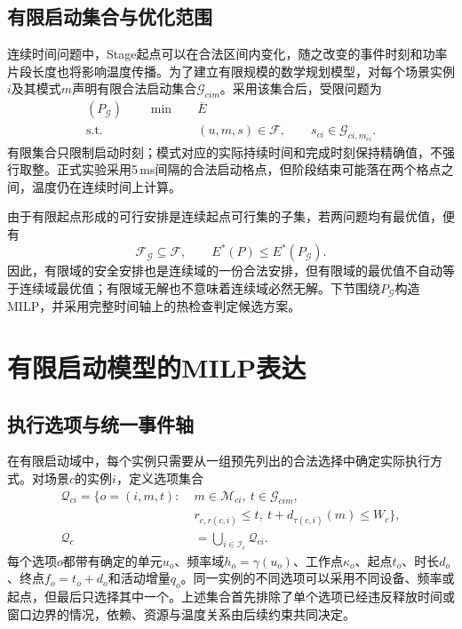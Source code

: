 \subsection{有限启动集合与优化范围}

连续时间问题中，Stage起点可以在合法区间内变化，随之改变的事件时刻和功率片段长度也将影响温度传播。为了建立有限规模的数学规划模型，对每个场景实例$i$及其模式$m$声明有限合法启动集合$\mathcal G_{cim}$。采用该集合后，受限问题为
\begin{equation}
 \begin{aligned}
 (P_{\mathcal G})\qquad
 \min\quad&\overline E\\
 \mathrm{s.t.}\quad&
   (u,m,s)\in\mathcal F,\qquad
   s_{ci}\in\mathcal G_{ci,m_{ci}}.
 \end{aligned}
 \label{eq:c3-finite-P}
\end{equation}
有限集合只限制启动时刻；模式对应的实际持续时间和完成时刻保持精确值，不强行取整。正式实验采用5\,ms间隔的合法启动格点，但阶段结束可能落在两个格点之间，温度仍在连续时间上计算。

由于有限起点形成的可行安排是连续起点可行集的子集，若两问题均有最优值，便有
\begin{equation}
 \mathcal F_{\mathcal G}\subseteq\mathcal F,\qquad
 E^*(P)\le E^*(P_{\mathcal G}).
 \label{eq:c3-restricted-bound}
\end{equation}
因此，有限域的安全安排也是连续域的一份合法安排，但有限域的最优值不自动等于连续域最优值；有限域无解也不意味着连续域必然无解。下节围绕$P_{\mathcal G}$构造MILP，并采用完整时间轴上的热检查判定候选方案。


\section{有限启动模型的MILP表达}

\subsection{执行选项与统一事件轴}

在有限启动域中，每个实例只需要从一组预先列出的合法选择中确定实际执行方式。对场景$c$的实例$i$，定义选项集合
\begin{equation}
 \begin{aligned}
 \mathcal Q_{ci}
 =\bigl\{o=(i,m,t):\;&m\in\mathcal M_{ci},\
 t\in\mathcal G_{cim},\\[-1mm]
 &r_{c,r(c,i)}\le t,\
 t+d_{\tau(c,i)}(m)\le W_c\bigr\},\\
 \mathcal Q_c&=\bigcup_{i\in\mathcal I_c}\mathcal Q_{ci}.
 \end{aligned}
 \label{eq:c3-options}
\end{equation}
每个选项$o$都带有确定的单元$u_o$、频率域$h_o=\gamma(u_o)$、工作点$\kappa_o$、起点$t_o$、时长$d_o$、终点$f_o=t_o+d_o$和活动增量$q_o$。同一实例的不同选项可以采用不同设备、频率或起点，但最后只选择其中一个。上述集合首先排除了单个选项已经违反释放时间或窗口边界的情况，依赖、资源与温度关系由后续约束共同决定。

